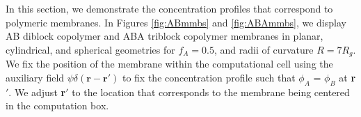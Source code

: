 \documentclass[twocolumn,aps,floatfix,nobibnotes]{revtex4-1}
\begin{document}
In this section, we demonstrate the concentration profiles that correspond to polymeric membranes. In Figures \ref{fig:ABmmbs} and \ref{fig:ABAmmbs}, we display AB diblock copolymer and ABA triblock copolymer membranes in planar, cylindrical, and spherical geometries for $f_A = 0.5$, and radii of curvature $R = 7R_g$. We fix the position of the membrane within the computational cell using the auxiliary field $\psi \delta(\textbf{r}-\textbf{r}')$ to fix the concentration profile such that $\phi_A$ = $\phi_B$ at \textbf{r}$'$. We adjust \textbf{r}$'$ to the location that corresponds to the membrane being centered in the computation box.

\begin{figure}[htp]
   

\end{figure}
\end{document}
